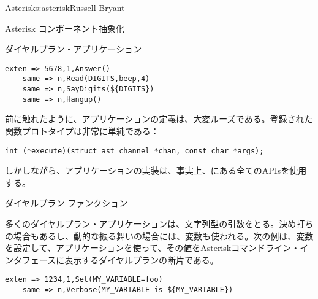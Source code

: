 \begin{aosachapter}{Asterisk}{s:asterisk}{Russell Bryant}
\begin{aosasect1}{Asterisk コンポーネント抽象化}
\begin{aosasect2}{ダイヤルプラン・アプリケーション}
\begin{verbatim}
exten => 5678,1,Answer()
    same => n,Read(DIGITS,beep,4)
    same => n,SayDigits(${DIGITS})
    same => n,Hangup()
\end{verbatim}

前に触れたように、アプリケーションの定義は、大変ルーズである。登録された関数プロトタイプは非常に単純である：

\begin{verbatim}
int (*execute)(struct ast_channel *chan, const char *args);
\end{verbatim}

\noindent
しかしながら、アプリケーションの実装は、事実上、にある全てのAPIsを使用する。

\end{aosasect2}

\begin{aosasect2}{ダイヤルプラン ファンクション}

多くのダイヤルプラン・アプリケーションは、文字列型の引数をとる。決め打ちの場合もあるし、動的な振る舞いの場合には、変数も使われる。次の例は、変数を設定して、アプリケーションを使って、その値をAsteriskコマンドライン・インタフェースに表示するダイヤルプランの断片である。

\begin{verbatim}
exten => 1234,1,Set(MY_VARIABLE=foo)
    same => n,Verbose(MY_VARIABLE is ${MY_VARIABLE})
\end{verbatim}


\end{aosasect2}
\end{aosasect1}
\end{aosachapter}
